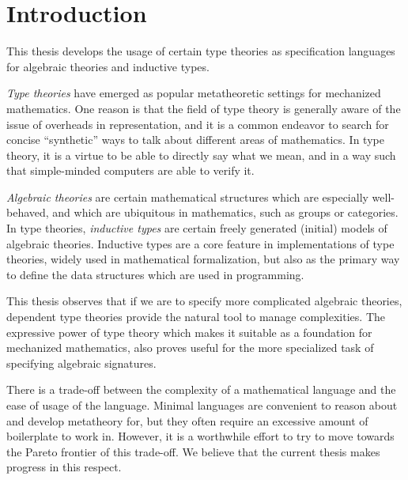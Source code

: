 \documentclass[12pt,a4paper,twoside,openany]{book}
\theoremstyle{remark}
\theoremstyle{definition}
\theoremstyle{theorem}
\begin{document}
\mainmatter


\chapter{Introduction}

This thesis develops the usage of certain type theories as specification
languages for algebraic theories and inductive types.

\emph{Type theories} have emerged as popular metatheoretic settings for
mechanized mathematics. One reason is that the field of type theory is generally
aware of the issue of overheads in representation, and it is a common endeavor
to search for concise ``synthetic'' ways to talk about different areas of
mathematics. In type theory, it is a virtue to be able to directly say what we
mean, and in a way such that simple-minded computers are able to verify it.

\emph{Algebraic theories} are certain mathematical structures which are
especially well-behaved, and which are ubiquitous in mathematics, such as groups
or categories. In type theories, \emph{inductive types} are certain freely
generated (initial) models of algebraic theories. Inductive types are a core
feature in implementations of type theories, widely used in mathematical
formalization, but also as the primary way to define the data structures which
are used in programming.

This thesis observes that if we are to specify more complicated algebraic
theories, dependent type theories provide the natural tool to manage
complexities. The expressive power of type theory which makes it suitable as a
foundation for mechanized mathematics, also proves useful for the more
specialized task of specifying algebraic signatures.

There is a trade-off between the complexity of a mathematical language and the
ease of usage of the language. Minimal languages are convenient to reason about
and develop metatheory for, but they often require an excessive amount of
boilerplate to work in. However, it is a worthwhile effort to try to move
towards the Pareto frontier of this trade-off. We believe that the current
thesis makes progress in this respect.
\end{document}
